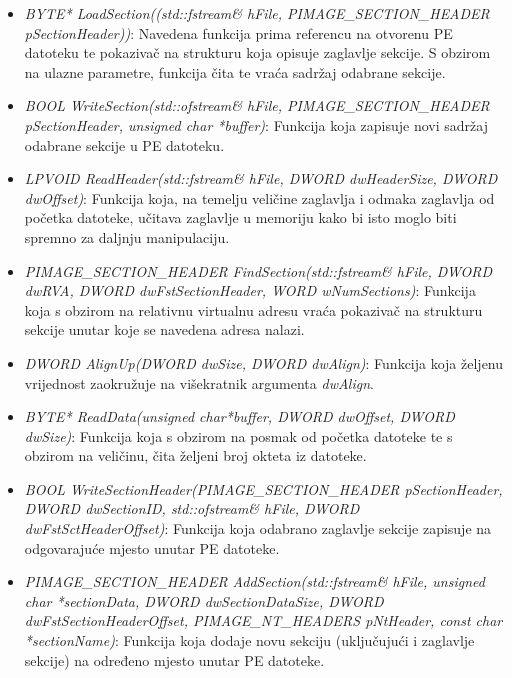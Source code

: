\documentclass[times, utf8, diplomski, numeric]{fer}
\begin{document}
\begin{itemize}

\item {\footnotesize \emph{BYTE* LoadSection((std::fstream\&
hFile, PIMAGE\_SECTION\_HEADER pSectionHeader))}}: Navedena
funkcija prima referencu na otvorenu PE datoteku te pokazivač na
strukturu koja opisuje zaglavlje sekcije. S obzirom na ulazne
parametre, funkcija čita te vraća sadržaj odabrane sekcije.

\item {\footnotesize \emph{BOOL WriteSection(std::ofstream\&
hFile, PIMAGE\_SECTION\_HEADER pSectionHeader, unsigned char
*buffer)}}: Funkcija koja zapisuje novi sadržaj odabrane sekcije
u PE datoteku.

\item {\footnotesize \emph{LPVOID ReadHeader(std::fstream\&
hFile, DWORD dwHeaderSize, DWORD dwOffset)}}: Funkcija koja, na
temelju veličine zaglavlja i odmaka zaglavlja od početka
datoteke, učitava zaglavlje u memoriju kako bi isto moglo biti
spremno za daljnju manipulaciju.

\item {\footnotesize \emph{PIMAGE\_SECTION\_HEADER
FindSection(std::fstream\& hFile, DWORD dwRVA, DWORD
dwFstSectionHeader, WORD wNumSections)}}: Funkcija koja s obzirom
na relativnu virtualnu adresu vraća pokazivač na strukturu
sekcije unutar koje se navedena adresa nalazi.

\item {\footnotesize \emph{DWORD AlignUp(DWORD dwSize, DWORD
dwAlign)}}: Funkcija koja željenu vrijednost zaokružuje na
višekratnik argumenta \emph{dwAlign}.

\item {\footnotesize \emph{BYTE* ReadData(unsigned char*buffer,
DWORD dwOffset, DWORD dwSize)}}: Funkcija koja s obzirom na
posmak od početka datoteke te s obzirom na veličinu, čita željeni
broj okteta iz datoteke.

\item {\footnotesize \emph{BOOL
WriteSectionHeader(PIMAGE\_SECTION\_HEADER pSectionHeader, DWORD
dwSectionID, std::ofstream\& hFile, DWORD
dwFstSctHeaderOffset)}}: Funkcija koja odabrano zaglavlje sekcije
zapisuje na odgovarajuće mjesto unutar PE datoteke.

\item {\footnotesize \emph{PIMAGE\_SECTION\_HEADER
AddSection(std::fstream\& hFile, unsigned char *sectionData,
DWORD dwSectionDataSize, DWORD dwFstSectionHeaderOffset,
PIMAGE\_NT\_HEADERS pNtHeader, const char *sectionName)}}:
Funkcija koja dodaje novu sekciju (uključujući i zaglavlje
sekcije) na određeno mjesto unutar PE datoteke.


\end{itemize}
\end{document}
